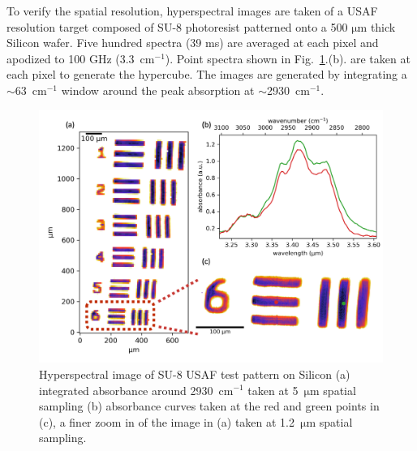 \documentclass{optica-article}
\begin{document}
To verify the spatial resolution, hyperspectral images are taken of a USAF resolution target composed of SU-8 photoresist patterned onto a 500 $\mathrm{\mu m}$ thick Silicon wafer. Five hundred spectra (39 ms) are averaged at each pixel and apodized to 100 GHz (\mbox{3.3 $\mathrm{cm^{-1}}$}). Point spectra shown in \mbox{Fig. \ref{fig:su8}.(b).} are taken at each pixel to generate the hypercube. The images are generated by integrating a \mbox{$\sim$63 $\mathrm{cm^{-1}}$} window around the peak absorption at \mbox{$\sim$2930 $\mathrm{cm^{-1}}$}. 


\begin{figure}[h]
    \centering
    \includegraphics[width=\linewidth]{su8_image.png}
    \caption{Hyperspectral image of SU-8 USAF test pattern on Silicon (a) integrated absorbance around \mbox{2930 $\mathrm{cm^{-1}}$} taken at \mbox{5 $\mathrm{\mu m}$} spatial sampling (b) absorbance curves taken at the red and green points in (c), a finer zoom in of the image in (a) taken at \mbox{1.2 $\mathrm{\mu m}$} spatial sampling.}
    \label{fig:su8}
\end{figure}
\end{document}
